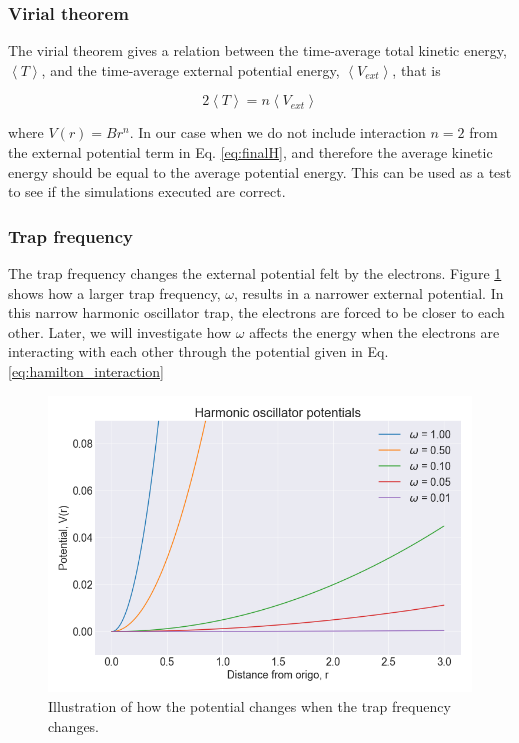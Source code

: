 \subsubsection{Virial theorem}

The virial theorem gives a relation between the time-average total kinetic energy, $\left<T\right>$, and the time-average external potential energy, $\left<V_{ext}\right>$, that is

\begin{equation}\label{eq:virial_theorem}
2\left< T\right> = n\left< V_{ext}\right>
\end{equation}

where $V(r) = Br^n$. In our case when we do not include interaction $n = 2$ from the external potential term in Eq. \ref{eq:finalH}, and therefore the average kinetic energy should be equal to the average potential energy. This can be used as a test to see if the simulations executed are correct. 

\subsubsection{Trap frequency}

The trap frequency changes the external potential felt by the electrons. Figure \ref{fig:harmonic_oscillator_potential} shows how a larger trap frequency, $\omega$, results in a narrower external potential. In this narrow harmonic oscillator trap, the electrons are forced to be closer to each other. Later, we will investigate how $\omega$ affects the energy when the electrons are interacting with each other through the potential given in Eq. \ref{eq:hamilton_interaction}

\begin{figure}[H]
\center
\includegraphics[width=0.7\linewidth]{../Results/harmonic_oscialltor_potentials}\caption{Illustration of how the potential changes when the trap frequency changes. }\label{fig:harmonic_oscillator_potential}
\end{figure}

